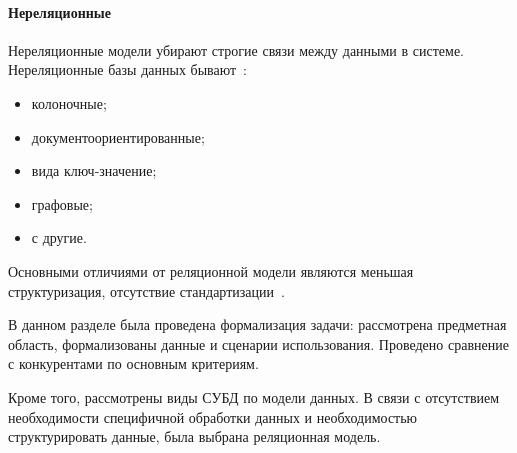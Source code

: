 \paragraph{Нереляционные} \mbox{}

Нереляционные модели убирают строгие связи между данными в системе. Нереляционные базы данных бывают~\cite{бородин2016задаче}:

\begin{itemize}
	\item колоночные;
	\item документоориентированные;
	\item вида ключ-значение;
	\item графовые;
	\item с другие.
\end{itemize}

Основными отличиями от реляционной модели являются меньшая структуризация, отсутствие стандартизации~\cite{корягин2020модели}.

В данном разделе была проведена формализация задачи: рассмотрена предметная область, формализованы данные и сценарии использования. Проведено сравнение с конкурентами по основным критериям.

Кроме того, рассмотрены виды СУБД по модели данных. В связи с отсутствием необходимости специфичной обработки данных и необходимостью структурировать данные, была выбрана реляционная модель.

 